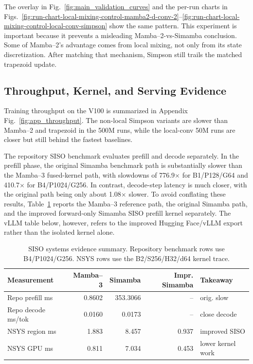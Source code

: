 \documentclass[conference]{IEEEtran}
\newcommand{\modelname}{Simamba\xspace}
\newcommand{\mambatwo}{Mamba--2\xspace}
\newcommand{\mambathree}{Mamba--3\xspace}
\begin{document}
The overlay in Fig.~\ref{fig:main_validation_curves} and the per-run charts in Figs.~\ref{fig:run-chart-local-mixing-control-mamba2-d-conv-2}--\ref{fig:run-chart-local-mixing-control-local-conv-simpson} show the same pattern. This experiment is important because it prevents a misleading \mambatwo-vs-\modelname conclusion. Some of \mambatwo's advantage comes from local mixing, not only from its state discretization. After matching that mechanism, Simpson still trails the matched trapezoid update.

\subsection{Throughput, Kernel, and Serving Evidence}

Training throughput on the V100 is summarized in Appendix Fig.~\ref{fig:app_throughput}. The non-local Simpson variants are slower than \mambatwo and trapezoid in the 500M runs, while the local-conv 50M runs are closer but still behind the fastest baselines.

The repository SISO benchmark evaluates prefill and decode separately. In the prefill phase, the original \modelname benchmark path is substantially slower than the \mambathree fused-kernel path, with slowdowns of 776.9$\times$ for B1/P128/G64 and 410.7$\times$ for B4/P1024/G256. In contrast, decode-step latency is much closer, with the original path being only about 1.08$\times$ slower. To avoid conflating these results, Table~\ref{tab:systems_summary} reports the \mambathree reference path, the original \modelname path, and the improved forward-only \modelname SISO prefill kernel separately. The vLLM table below, however, refers to the improved Hugging Face/vLLM export rather than the isolated kernel alone.

\begin{table}[t]
\caption{SISO systems evidence summary. Repository benchmark rows use B4/P1024/G256. NSYS rows use the B2/S256/H32/d64 kernel trace.}
\label{tab:systems_summary}
\centering
\scriptsize
\begin{tabular}{@{}lrrrl@{}}
\toprule
Measurement & \mambathree & \modelname & Impr. \modelname & Takeaway\\
\midrule
Repo prefill ms & 0.8602 & 353.3066 & -- & orig. slow\\
Repo decode ms/tok & 0.0160 & 0.0173 & -- & close decode\\
NSYS region ms & 1.883 & 8.457 & 0.937 & improved SISO\\
NSYS GPU ms & 0.811 & 7.034 & 0.453 & lower kernel work\\
\bottomrule
\end{tabular}
\end{table}
\end{document}
